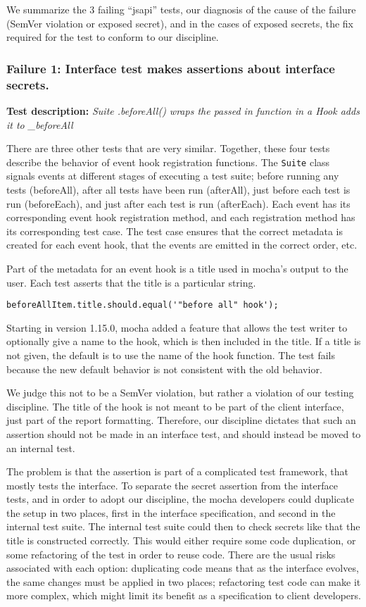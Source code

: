 We summarize the 3 failing ``jsapi'' tests, our diagnosis of the cause of
the failure (SemVer violation or exposed secret), and in the cases of
exposed secrets, the fix required for the test to conform to our
discipline.

\subsubsection{Failure 1: Interface test makes assertions about
interface secrets.}
{\bf Test description: } {\em Suite .beforeAll() wraps the passed in
function in a Hook adds it to \_beforeAll}
\label{sec:failure1}

There are three other tests that are very similar. Together, these
four tests describe the behavior of event hook registration
functions. The {\tt Suite} class signals events at different stages of
executing a test suite; before running any tests (beforeAll), after
all tests have been run (afterAll), just before each test is run
(beforeEach), and just after each test is run (afterEach). Each event
has its corresponding event hook registration method, and each
registration method has its corresponding test case. The test case
ensures that the correct metadata is created for each event hook, that
the events are emitted in the correct order, etc.

Part of the metadata for an event hook is a title used in mocha's
output to the user. Each test asserts that the title is a particular
string.

{\small
\begin{verbatim}
beforeAllItem.title.should.equal('"before all" hook');
\end{verbatim}
}

Starting in version 1.15.0, mocha added a feature that allows the test
writer to optionally give a name to the hook, which is then included
in the title. If a title is not given, the default is to use the name
of the hook function. The test fails because the new default behavior
is not consistent with the old behavior.

We judge this not to be a SemVer violation, but rather a violation of
our testing discipline. The title of the hook is not meant to be part
of the client interface, just part of the report
formatting. Therefore, our discipline dictates that such an assertion
should not be made in an interface test, and should instead be moved
to an internal test.

The problem is that the assertion is part of a complicated test
framework, that mostly tests the interface. To separate the
secret assertion from the interface tests, and in order to adopt our
discipline, the mocha developers could duplicate the setup in two places,
first in the interface specification, and second in the
internal test suite. The internal test suite could then to check secrets
like that the title is constructed correctly. This would either require
some code duplication, or some refactoring of the test in order to reuse
code. There are the usual risks associated with each option: duplicating
code means that as the interface evolves, the same changes must be
applied in two places; refactoring test code can make it more complex,
which might limit its benefit as a specification to client developers.

